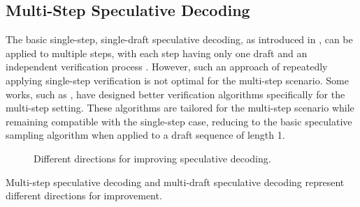 \documentclass{article}
\begin{document}
\subsection{Multi-Step Speculative Decoding}\label{sec:related_multi_step}
The basic single-step, single-draft speculative decoding, as introduced in , can be applied to multiple steps, with each step having only one draft and an independent verification process \citep{leviathan2023fast,chen2023accelerating}. However, such an approach of repeatedly applying single-step verification is not optimal for the multi-step scenario. Some works, such as \citet{sun2024optimal,huaccelerated,sunblock}, have designed better verification algorithms specifically for the multi-step setting. These algorithms are tailored for the multi-step scenario while remaining compatible with the single-step case, reducing to the basic speculative sampling algorithm when applied to a draft sequence of length 1.

\begin{figure}[h]
\centering
{}

\caption{Different directions for improving speculative decoding.}
\label{fig:related_work}
\end{figure}


Multi-step speculative decoding and multi-draft speculative decoding represent different directions for improvement.
\end{document}
